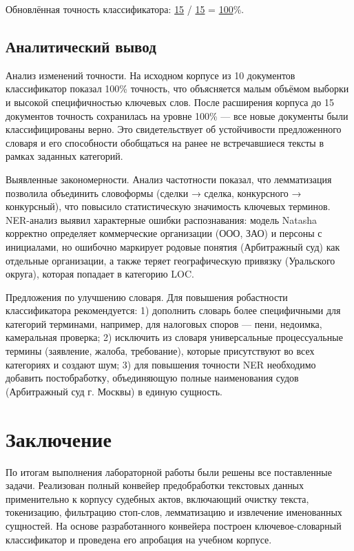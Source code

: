 \documentclass[12pt, a4paper]{report}
\newcommand{\placeholder}[2][Вставьте результат]{%
  \begin{tcolorbox}[placeholderbox, title={#2}]
    #1
  \end{tcolorbox}%
  \vspace{4pt}%
}
\begin{document}
Обновлённая точность классификатора: \underline{15} /
\underline{15} = \underline{100}\%.

\section{Аналитический вывод}

\placeholder[
  Анализ изменений точности. На исходном корпусе из 10 документов классификатор показал 100\% точность, что объясняется малым объёмом выборки и высокой специфичностью ключевых слов. После расширения корпуса до 15 документов точность сохранилась на уровне 100\% — все новые документы были классифицированы верно. Это свидетельствует об устойчивости предложенного словаря и его способности обобщаться на ранее не встречавшиеся тексты в рамках заданных категорий.

  Выявленные закономерности. Анализ частотности показал, что лемматизация позволила объединить словоформы (сделки → сделка, конкурсного → конкурсный), что повысило статистическую значимость ключевых терминов. NER-анализ выявил характерные ошибки распознавания: модель Natasha корректно определяет коммерческие организации (ООО, ЗАО) и персоны с инициалами, но ошибочно маркирует родовые понятия (Арбитражный суд) как отдельные организации, а также теряет географическую привязку (Уральского округа), которая попадает в категорию LOC.

  Предложения по улучшению словаря. Для повышения робастности классификатора рекомендуется: 1) дополнить словарь более специфичными для категорий терминами, например, для налоговых споров — пени, недоимка, камеральная проверка; 2) исключить из словаря универсальные процессуальные термины (заявление, жалоба, требование), которые присутствуют во всех категориях и создают шум; 3) для повышения точности NER необходимо добавить постобработку, объединяющую полные наименования судов (Арбитражный суд г. Москвы) в единую сущность.
]{Аналитический вывод по индивидуальному заданию}

\chapter{Заключение}

По итогам выполнения лабораторной работы были решены все поставленные задачи.
Реализован полный конвейер предобработки текстовых данных применительно к корпусу
судебных актов, включающий очистку текста, токенизацию, фильтрацию стоп-слов,
лемматизацию и извлечение именованных сущностей. На основе разработанного конвейера
построен ключевое-словарный классификатор и проведена его апробация на учебном корпусе.
\end{document}
